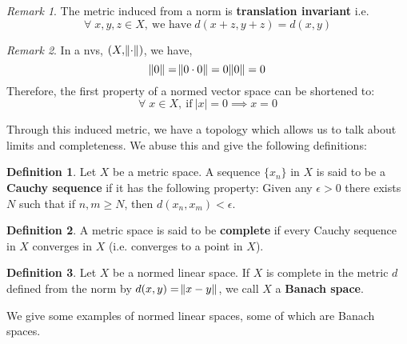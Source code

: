 \documentclass[a4paper, 11pt]{book}
\theoremstyle{definition}
\newtheorem{definition}{Definition}[section]
\theoremstyle{remark}
\newtheorem*{remark}{Remark}
\begin{document}
    \begin{remark}
        The metric induced from a norm is \textbf{translation invariant} i.e.
        \[ \forall\;x,y,z\in X,\:\text{we have}\; d(x+z,y+z) = d(x,y) \]
    \end{remark}

    \begin{remark}
        In a nvs, $(X,\norm{\cdot})$, we have,
        \[ \norm{0} = \norm{ 0 \cdot 0} = 0\norm{0} = 0 \]
        Therefore, the first property of a normed vector space can be shortened to:
        \[ \forall\; x\in X,\:\text{if}\:|x|=0\implies x=0 \]
    \end{remark}

    Through this induced metric, we have a topology which allows us to talk about limits and completeness. We abuse this and
    give the following definitions:

    \begin{definition}
        Let $X$ be a metric space. A sequence $\{x_n\}$ in $X$ is said to be a \textbf{Cauchy sequence} if it has the following
        property: Given any $\epsilon>0$ there exists $N$ such that if $n,m\geq N$, then $d(x_n,x_m)<\epsilon$.
    \end{definition}

    \begin{definition}
        A metric space is said to be \textbf{complete} if every Cauchy sequence in $X$ converges in $X$ (i.e. converges to a point
        in $X$).
    \end{definition}

    \begin{definition}
        Let $X$ be a normed linear space. If $X$ is complete in the metric $d$ defined from the norm by $d(x,y)=\norm{x-y}$, we
        call $X$ a \textbf{Banach space}.
    \end{definition}

    We give some examples of normed linear spaces, some of which are Banach spaces.
\end{document}

